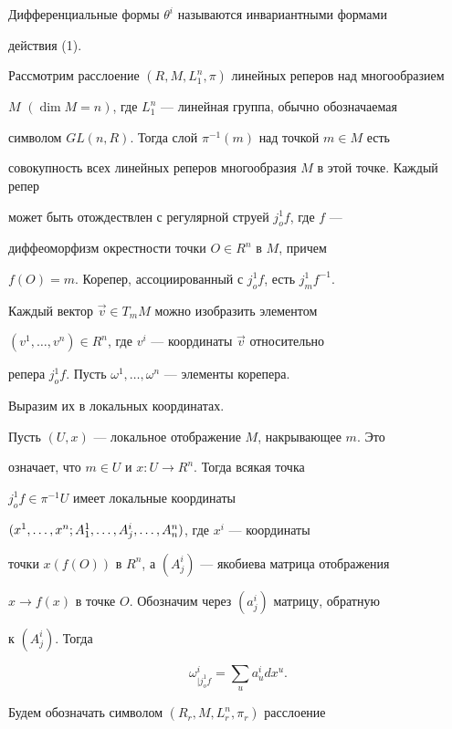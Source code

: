 Дифференциальные формы $\theta^i$ называются инвариантными формами


действия (1).





Рассмотрим расслоение $(R,M,L^n_1,\pi)$ линейных реперов над многообразием


$M$ $(\dim M = n)$, где $L^n_1$ --- линейная группа, обычно обозначаемая


символом $GL(n,R)$. Тогда слой $\pi^{-1}(m)$ над точкой $m \in M$ есть


совокупность всех линейных реперов многообразия $M$ в этой точке. Каждый репер


может быть отождествлен с регулярной струей $j^1_o f$, где $f$ ---


диффеоморфизм окрестности точки $O \in R^n$ в $M$, причем


$f(O) = m$. Корепер, ассоциированный с $j^1_o f$, есть $j^1_m f^{-1}$.


Каждый вектор $\Vec v \in T_m M$ можно изобразить элементом


$(v^1,\dotsc,v^n) \in R^n$, где $v^i$ --- координаты $\Vec v$ относительно


репера $j^1_o f$. Пусть $\omega^1,\dotsc,\omega^n$ --- элементы корепера.


Выразим их в локальных координатах.





Пусть $(U,x)$ --- локальное отображение $M$, накрывающее $m$. Это


означает, что $m \in U$ и $x: U \to R^n$. Тогда всякая точка


$j^1_o f \in \pi^{-1} U$ имеет локальные координаты


$(x^1,\dotsc,x^n; A^1_1,\dotsc,\linebreak


A^i_j,\dotsc,A^n_n)$, где $x^i$ --- координаты


точки $x(f(O))$ в $R^n$, а $(A^i_j)$ --- якобиева матрица отображения


$x \to f(x)$ в точке $O$. Обозначим через $(a^i_j)$ матрицу, обратную


к $(A^i_j)$. Тогда


$$


\omega^i_{|j^1_o f} = \sum_u a^i_u dx^u.


$$





Будем обозначать символом $(R_r, M, L^n_r,\pi_r)$ расслоение


